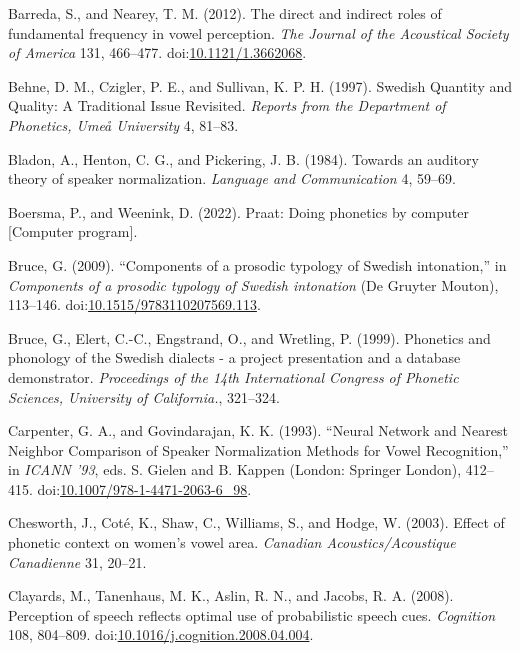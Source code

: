 \documentclass[utf8]{frontiersSCNS}
\newlength{\cslhangindent}
\newlength{\cslentryspacingunit} %
\newenvironment{CSLReferences}[2] %
 {%
  \setlength{\parindent}{0pt}
  \ifodd #1
  \let\oldpar\par
  \def\par{\hangindent=\cslhangindent\oldpar}
  \fi
  \setlength{\parskip}{#2\cslentryspacingunit}
 }%
 {}
\begin{document}
\begin{CSLReferences}{1}{0}
\leavevmode{}%
Barreda, S., and Nearey, T. M. (2012). The direct and indirect roles of fundamental frequency in vowel perception. \emph{The Journal of the Acoustical Society of America} 131, 466--477. doi:\href{https://doi.org/10.1121/1.3662068}{10.1121/1.3662068}.

\leavevmode{}%
Behne, D. M., Czigler, P. E., and Sullivan, K. P. H. (1997). Swedish {Quantity} and {Quality}: {A Traditional Issue Revisited}. \emph{Reports from the Department of Phonetics, Umeå University} 4, 81--83.

\leavevmode{}%
Bladon, A., Henton, C. G., and Pickering, J. B. (1984). Towards an auditory theory of speaker normalization. \emph{Language and Communication} 4, 59--69.

\leavevmode{}%
Boersma, P., and Weenink, D. (2022). Praat: {Doing} phonetics by computer {[}{Computer} program{]}.

\leavevmode{}%
Bruce, G. (2009). {``Components of a prosodic typology of {Swedish} intonation,''} in \emph{Components of a prosodic typology of {Swedish} intonation} ({De Gruyter Mouton}), 113--146. doi:\href{https://doi.org/10.1515/9783110207569.113}{10.1515/9783110207569.113}.

\leavevmode{}%
Bruce, G., Elert, C.-C., Engstrand, O., and Wretling, P. (1999). Phonetics and phonology of the {Swedish} dialects - a project presentation and a database demonstrator. \emph{Proceedings of the 14th International Congress of Phonetic Sciences, University of California.}, 321--324.

\leavevmode{}%
Carpenter, G. A., and Govindarajan, K. K. (1993). {``Neural {Network} and {Nearest Neighbor Comparison} of {Speaker Normalization Methods} for {Vowel Recognition},''} in \emph{{ICANN} '93}, eds. S. Gielen and B. Kappen ({London}: {Springer London}), 412--415. doi:\href{https://doi.org/10.1007/978-1-4471-2063-6_98}{10.1007/978-1-4471-2063-6\_98}.

\leavevmode{}%
Chesworth, J., Coté, K., Shaw, C., Williams, S., and Hodge, W. (2003). Effect of phonetic context on women's vowel area. \emph{Canadian Acoustics/Acoustique Canadienne} 31, 20--21.

\leavevmode{}%
Clayards, M., Tanenhaus, M. K., Aslin, R. N., and Jacobs, R. A. (2008). Perception of speech reflects optimal use of probabilistic speech cues. \emph{Cognition} 108, 804--809. doi:\href{https://doi.org/10.1016/j.cognition.2008.04.004}{10.1016/j.cognition.2008.04.004}.


\end{CSLReferences}
\end{document}
